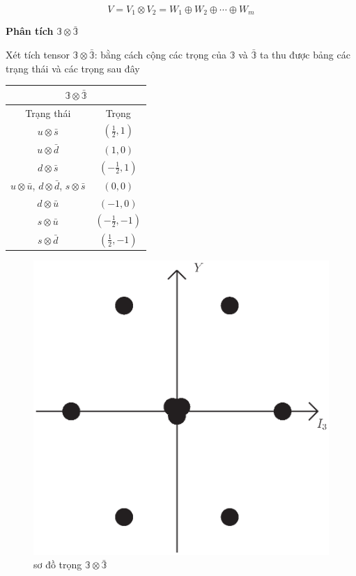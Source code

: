 \documentclass{report}
\begin{document}
	\[ V = V_{1} \otimes V_{2} = W_{1} \oplus W_{2} \oplus \cdots \oplus W_{m} \]
	
\textbf{Phân tích} \( \mathbb{3} \otimes \bar{\mathbb{3}} \)

Xét tích tensor \( \mathbb{3} \otimes \bar{\mathbb{3}} \): bằng cách cộng các trọng của \( \mathbb{3} \) và \( \bar{\mathbb{3}} \) ta thu được bảng các trạng thái và các trọng sau đây

	\begin{center}
		\begin{tabular}{ |c|c| }
			\hline
				\multicolumn{2}{|c|}{\( \mathbb{3} \otimes \bar{\mathbb{3}} \)} \\
			\hline	
 				Trạng thái & Trọng \\
 			\hline
 				\( u \otimes \bar{s} \) & \( \left( \frac{1}{2}, 1 \right) \) \\ 	
			\hline
 				\( u \otimes \bar{d} \) & \( \left( 1, 0 \right) \) \\ 	
			\hline
				\( d \otimes \bar{s} \) & \( \left( - \frac{1}{2}, 1 \right) \) \\ 	
			\hline
				\( u \otimes \bar{u} \), \( d \otimes \bar{d} \), \( s \otimes \bar{s} \) & \( \left( 0, 0 \right) \) \\ 	
			\hline
				\( d \otimes \bar{u} \) & \( \left( - 1, 0 \right) \) \\ 	
			\hline
				\( s \otimes \bar{u} \) & \( \left( - \frac{1}{2}, -1 \right) \) \\ 	
			\hline
				\( s \otimes \bar{d} \) & \( \left( \frac{1}{2}, - 1 \right) \) \\ 	
			\hline
	\end{tabular}
	\end{center}

	\begin{figure}[!htb]
		\centering
		\includegraphics[scale=0.5]{diagram5.eps}
		\caption{sơ đồ trọng \( \mathbb{3} \otimes \bar{\mathbb{3}} \)}
	\end{figure}	
	
\end{document}
